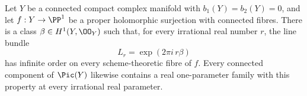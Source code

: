 \begin{proposition}\hypertarget{tag-01G7}{}\label{cdp:st:D.1.9}

Let $Y$ be a connected compact complex manifold with
$b_1(Y)=b_2(Y)=0$, and let $f:Y\to\PP^1$ be a proper
holomorphic surjection with connected fibres. There is a class
$\beta\in H^1(Y,\OO_Y)$ such that, for every irrational real number
$r$, the line bundle
\[
L_r=\exp(2\pi i\,r\beta)
\]
has infinite order on every scheme-theoretic fibre of $f$.
Every connected component of $\Pic(Y)$ likewise contains a real
one-parameter family with this property at every irrational real
parameter.

\end{proposition}


